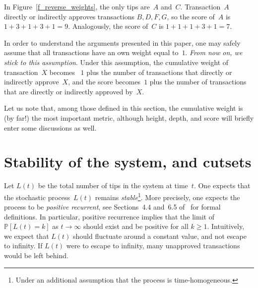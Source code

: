 \documentclass[12pt]{article}
\newcommand{\IP}{\mathbb{P}}
\begin{document}
In Figure~\ref{f_reverse_weights},
the only 
tips are~$A$ and~$C$.
Transaction~$A$ directly or indirectly approves 
transactions $B,D,F,G$, so the score of~$A$
is $1+3+1+3+1=9$. Analogously, the score
of~$C$ is $1+1+1+3+1=7$.

In order to understand the arguments presented in this paper,
one may safely assume that all transactions have an own weight
 equal to~$1$.  
\emph{From now on, we stick to this assumption}.
Under this assumption, the cumulative weight of 
transaction~$X$ becomes
~$1$ plus the number of transactions that directly or 
indirectly approve~$X$, and 
the score 
becomes~$1$ plus the number of transactions
that are directly or indirectly approved by~$X$. 

Let us note that, among those defined 
in this section, the cumulative weight
is (by far!) the most important metric, although 
height, depth, and score will 
briefly enter some discussions as well.




\section{Stability of the system, and cutsets}
\label{s_cutsets}

Let $L(t)$ be the total number of tips 
in the system at time~$t$. One
 expects that 
the stochastic process~$L(t)$ remains \emph{stable}\footnote{Under
an additional assumption that the process is time-homogeneous.}.
More precisely, one expects the process to be \emph{positive recurrent}, see Sections~4.4 and~6.5
of~\cite{Ross_m} for formal definitions. 
In particular, positive recurrence implies that the limit of 
$\IP[L(t)=k]$ as $t\to \infty$ should
exist and be positive for all $k\geq 1$. 
Intuitively, we expect that $L(t)$ should fluctuate 
around a constant value, and not escape to infinity.
If $L(t)$ were to escape to infinity, many unapproved transactions
would be left behind.
\end{document}
